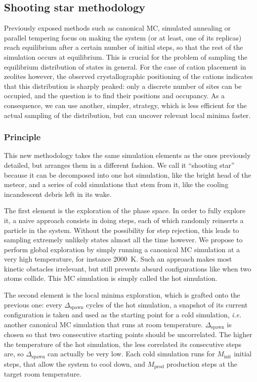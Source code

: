 \documentclass[main.tex]{subfiles}
\begin{document}
\subsection{Shooting star methodology}

Previously exposed methods such as canonical MC, simulated annealing or parallel tempering focus on making the system (or at least, one of its replicas) reach equilibrium after a certain number of initial steps, so that the rest of the simulation occurs at equilibrium. This is crucial for the problem of sampling the equilibrium distribution of states in general. For the case of cation placement in zeolites however, the observed crystallographic positioning of the cations indicates that this distribution is sharply peaked: only a discrete number of sites can be occupied, and the question is to find their positions and occupancy. As a consequence, we can use another, simpler, strategy, which is less efficient for the actual sampling of the distribution, but can uncover relevant local minima faster.

\subsubsection{Principle}

This new methodology takes the same simulation elements as the ones previously detailed, but arranges them in a different fashion. We call it ``shooting star'' because it can be decomposed into one hot simulation, like the bright head of the meteor, and a series of cold simulations that stem from it, like the cooling incandescent debris left in its wake.

The first element is the exploration of the phase space. In order to fully explore it, a naive approach consists in doing steps, each of which randomly reinserts a particle in the system. Without the possibility for step rejection, this leads to sampling extremely unlikely states almost all the time however. We propose to perform global exploration by simply running a canonical MC simulation at a very high temperature, for instance \qty{2000}{K}. Such an approach makes most kinetic obstacles irrelevant, but still prevents absurd configurations like when two atoms collide. This MC simulation is simply called the hot simulation.

The second element is the local minima exploration, which is grafted onto the previous one: every $\Delta_{\text{spawn}}$ cycles of the hot simulation, a snapshot of its current configuration is taken and used as the starting point for a cold simulation, \textit{i.e.} another canonical MC simulation that runs at room temperature. $\Delta_{\text{spawn}}$ is chosen so that two consecutive starting points should be uncorrelated. The higher the temperature of the hot simulation, the less correlated its consecutive steps are, so $\Delta_{\text{spawn}}$ can actually be very low. Each cold simulation runs for $M_\text{init}$ initial steps, that allow the system to cool down, and $M_\text{prod}$ production steps at the target room temperature.
\end{document}
